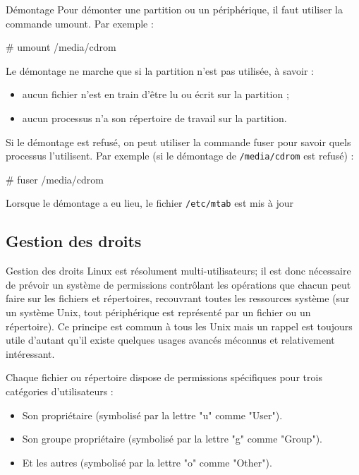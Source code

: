 \documentclass[10pt]{beamer}
\begin{document}
\begin{frame}{Démontage}
Pour  démonter  une  partition  ou un  périphérique,  il faut  utiliser  la commande
\alert{umount}. 
Par exemple :
 
\# \alert{umount /media/cdrom} 
\pause

Le démontage ne marche que si la partition n'est pas utilisée, à savoir :
\begin{itemize} 
\item aucun fichier n'est en train d'être lu ou écrit sur la partition ; 
\item aucun processus n'a son répertoire de travail sur la partition. 
\end{itemize}
\pause
Si le démontage est refusé, on peut utiliser la commande fuser pour savoir quels
processus l'utilisent. Par exemple (si le démontage de \texttt{/media/cdrom} est refusé) :

\# \alert{fuser /media/cdrom} 

Lorsque le démontage a eu lieu, le fichier \texttt{/etc/mtab} est mis à jour
\end{frame}

\subsection{Gestion des droits}
\begin{frame}{Gestion des droits}
Linux est résolument multi-utilisateurs; il est donc nécessaire de prévoir un système de permissions contrôlant les opérations que chacun peut faire sur les fichiers et répertoires, recouvrant toutes les ressources système (sur un système Unix, tout périphérique est représenté par un fichier ou un répertoire). Ce principe est commun à tous les Unix mais un rappel est toujours utile d'autant qu'il existe quelques usages avancés méconnus et relativement intéressant.

Chaque fichier ou répertoire dispose de permissions spécifiques pour trois catégories d'utilisateurs :

\begin{itemize}
\item Son propriétaire (symbolisé par la lettre "\alert{u}" comme "\alert{User}").
\item Son groupe propriétaire (symbolisé par la lettre "\alert{g}" comme "\alert{Group}").
\item Et les autres (symbolisé par la lettre "\alert{o}" comme "\alert{Other}").
\end{itemize}
\end{frame}
\end{document}
